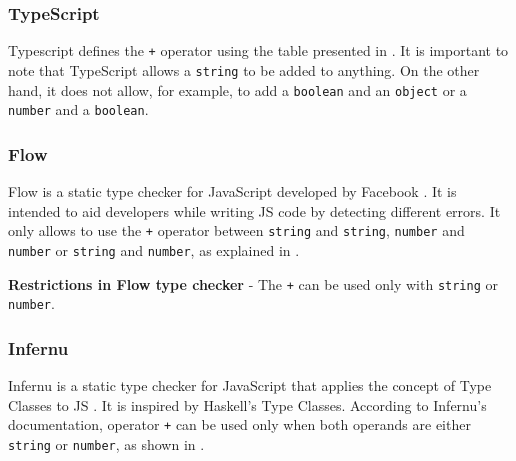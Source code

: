 \subsubsection{TypeScript}
Typescript defines the \texttt{+} operator using the table presented in . It is important to note that TypeScript allows a \texttt{string} to be added to anything. On the other hand, it does not allow, for example, to add a \texttt{boolean} and an \texttt{object} or a \texttt{number} and a \texttt{boolean}.



\subsubsection{Flow}
Flow is a static type checker for JavaScript developed by Facebook \citep{flow}\citep{FLOW_DBLP:journals/pacmpl/ChaudhuriVGRL17}. It is intended to aid developers while writing JS code by detecting different errors. It only allows to use the \texttt{+} operator between \texttt{string} and \texttt{string}, \texttt{number} and \texttt{number} or \texttt{string} and \texttt{number}, as explained in .

\begin{code}
  \captionsetup{aboveskip=0pt, belowskip=10pt}
  \caption[Restrictions in Flow type checker]{\textbf{Restrictions in Flow type checker} - The \texttt{+} can be used only with \texttt{string} or \texttt{number}.}
  \label{code:type-inference-constraints-flow}
\end{code}


\subsubsection{Infernu}
Infernu is a static type checker for JavaScript that applies the concept of Type Classes to JS \citep{infernu}. It is inspired by Haskell's Type Classes. According to Infernu's documentation, operator \texttt{+} can be used only when both operands are either \texttt{string} or \texttt{number}, as shown in .

